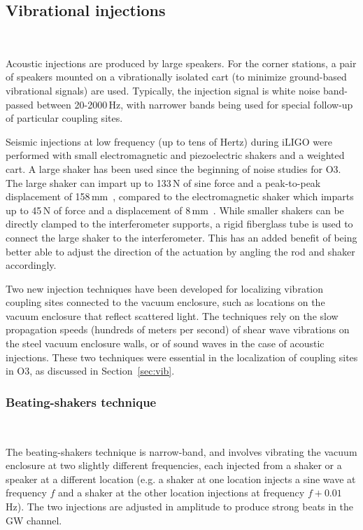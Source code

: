 \subsection{Vibrational injections}~\label{sec:injections-vib}

Acoustic injections are produced by large speakers.
For the corner stations, a pair of speakers mounted on a vibrationally isolated cart (to minimize ground-based vibrational signals) are used.
Typically, the injection signal is white noise band-passed between 20-2000\,Hz, with narrower bands being used for special follow-up of particular coupling sites.

Seismic injections at low frequency (up to tens of Hertz) during \ac{iLIGO} were performed with small electromagnetic and piezoelectric shakers and a weighted cart.
A large shaker has been used since the beginning of noise studies for \ac{O3}.
The large shaker can impart up to 133\,N of sine force and a peak-to-peak displacement of 158\,mm~\citep{big_shaker}, compared to the electromagnetic shaker which imparts up to 45\,N of force and a displacement of 8\,mm~\citep{bk}.
While smaller shakers can be directly clamped to the interferometer supports, a rigid fiberglass tube is used to connect the large shaker to the interferometer.
This has an added benefit of being better able to adjust the direction of the actuation by angling the rod and shaker accordingly.

Two new injection techniques have been developed for localizing vibration coupling sites connected to the vacuum enclosure, such as locations on the vacuum enclosure that reflect scattered light.
The techniques rely on the slow propagation speeds (hundreds of meters per second) of shear wave vibrations on the steel vacuum enclosure walls, or of sound waves in the case of acoustic injections.
These two techniques were essential in the localization of coupling sites in \ac{O3}, as discussed in Section~\ref{sec:vib}.

\subsubsection{Beating-shakers technique}~\label{sec:injections-vib-beats}

The beating-shakers technique is narrow-band, and involves vibrating the vacuum enclosure at two slightly different frequencies, each injected from a shaker or a speaker at a different location (e.g. a shaker at one location injects a sine wave at frequency $f$ and a shaker at the other location injections at frequency $f + 0.01$\,Hz).
The two injections are adjusted in amplitude to produce strong beats in the \ac{GW} channel.

